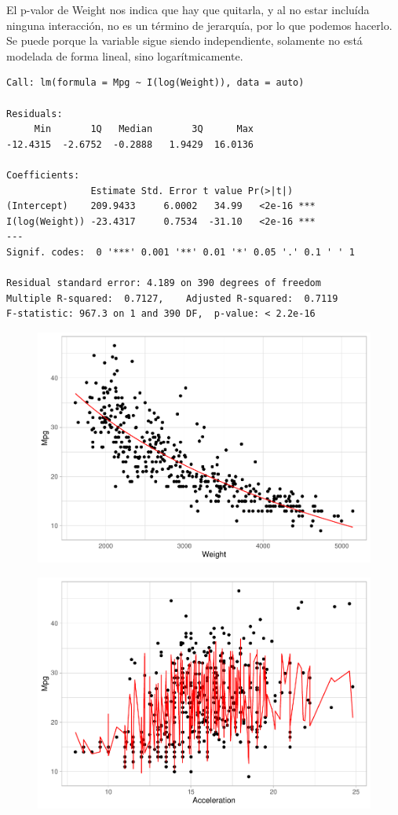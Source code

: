 El p-valor de Weight nos indica que hay que quitarla, y al no estar incluída ninguna interacción, no es un término de jerarquía, por lo que podemos hacerlo. Se puede porque la variable sigue siendo independiente, solamente no está modelada de forma lineal, sino logarítmicamente.

\begin{verbatim}
Call: lm(formula = Mpg ~ I(log(Weight)), data = auto)

Residuals:
     Min       1Q   Median       3Q      Max 
-12.4315  -2.6752  -0.2888   1.9429  16.0136 

Coefficients:
               Estimate Std. Error t value Pr(>|t|)    
(Intercept)    209.9433     6.0002   34.99   <2e-16 ***
I(log(Weight)) -23.4317     0.7534  -31.10   <2e-16 ***
---
Signif. codes:  0 '***' 0.001 '**' 0.01 '*' 0.05 '.' 0.1 ' ' 1

Residual standard error: 4.189 on 390 degrees of freedom
Multiple R-squared:  0.7127,    Adjusted R-squared:  0.7119 
F-statistic: 967.3 on 1 and 390 DF,  p-value: < 2.2e-16
\end{verbatim}

\begin{figure}[H]\includegraphics[width=.9\linewidth]{img/Regresion_files/figure-latex/unnamed-chunk-24-1} \caption{}\end{figure}

\begin{figure}[H]\includegraphics[width=.9\linewidth]{img/Regresion_files/figure-latex/unnamed-chunk-24-2} \caption{}\end{figure}

